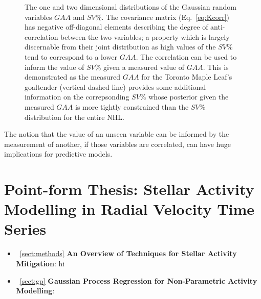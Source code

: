 \begin{figure}
  \centering
  \caption{The one and two dimensional distributions of the Gaussian random
    variables $GAA$ and $SV$\%.
    The covariance matrix (Eq.~\ref{eq:Kcorr}) has negative off-diagonal
    elements describing the degree of anti-correlation between the two
    variables; a property which is largely discernable from their joint
    distribution as high values of the $SV$\% tend to correspond to a lower
    $GAA$. The correlation can be used to inform the value of $SV$\% given a
    measured value of $GAA$. This is demonstrated as the measured $GAA$ 
    for the Toronto Maple Leaf's goaltender (vertical dashed line) provides some
    additional information on the correpsonding $SV$\% whose posterior given the
    measured $GAA$ is more tightly constrained than the $SV$\% distribution for
    the entire NHL.}
  \label{fig:corr2d}
\end{figure}

The notion that the value of an unseen variable can be informed by the measurement
of another, if those variables are correlated, can have huge implications for
predictive models.


\section{Point-form Thesis: Stellar Activity Modelling in Radial Velocity
  Time Series}
\begin{itemize}
\renewcommand\labelitemi{--}
\item~\ref{sect:methods} \textbf{An Overview of Techniques for Stellar Activity
Mitigation}: hi \\
\item~\ref{sect:gp} \textbf{Gaussian Process Regression for Non-Parametric
  Activity Modelling}:
\end{itemize}
